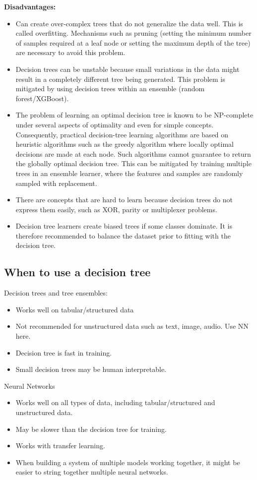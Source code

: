 \documentclass[12pt]{report}
\begin{document}
\textbf{Disadvantages:}

\begin{itemize}
\item Can create over-complex trees that do not generalize the data well. This is called overfitting. Mechanisms such as pruning (setting the minimum number of samples required at a leaf node or setting the maximum depth of the tree) are necessary to avoid this problem.
\item Decision trees can be unstable because small variations in the data might result in a completely different tree being generated. This problem is mitigated by using decision trees within an ensemble (random forest/XGBoost).
\item The problem of learning an optimal decision tree is known to be NP-complete under several aspects of optimality and even for simple concepts. Consequently, practical decision-tree learning algorithms are based on heuristic algorithms such as the greedy algorithm where locally optimal decisions are made at each node. Such algorithms cannot guarantee to return the globally optimal decision tree. This can be mitigated by training multiple trees in an ensemble learner, where the features and samples are randomly sampled with replacement.
\item There are concepts that are hard to learn because decision trees do not express them easily, such as XOR, parity or multiplexer problems.
\item Decision tree learners create biased trees if some classes dominate. It is therefore recommended to balance the dataset prior to fitting with the decision tree.
\end{itemize}

\subsection{When to use a decision tree}
Decision trees and tree ensembles:
\begin{itemize}
  \item Works well on tabular/structured data
  \item Not recommended for unstructured data such as text, image, audio. Use NN here.
  \item Decision tree is fast in training.
  \item Small decision trees may be human interpretable.
\end{itemize}
Neural Networks
\begin{itemize}
  \item Works well on all types of data, including tabular/structured and unstructured data.
  \item May be slower than the decision tree for training.
  \item Works with transfer learning.
  \item When building a system of multiple models working together, it might be easier to string together multiple neural networks.
\end{itemize}
\end{document}
